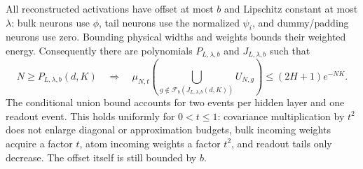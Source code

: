 All reconstructed activations have offset at most $b$ and Lipschitz
constant at most $\lambda$: bulk neurons use $\phi$, tail neurons use
the normalized $\psi_i$, and dummy/padding neurons use zero. Bounding
physical widths and weights bounds their weighted energy. Consequently
there are polynomials $P_{L,\lambda,b}$ and $J_{L,\lambda,b}$ such that
\begin{equation}\label{eq:offset-endpoint}
 N\ge P_{L,\lambda,b}(d,K)\quad\Longrightarrow\quad
 \mu_{N,t}\left(\bigcup_{g\notin\mathcal F_b(J_{L,\lambda,b}(d,K))}
 U_{N,g}\right)\le(2H+1)e^{-NK}.
\end{equation}
The conditional union bound accounts for two events per hidden layer
and one readout event. This holds uniformly for $0<t\le1$: covariance
multiplication by $t^2$ does not enlarge diagonal or approximation budgets,
bulk incoming weights acquire a factor $t$, atom incoming weights a factor
$t^2$, and readout tails only decrease. The offset itself is still bounded
by $b$.

